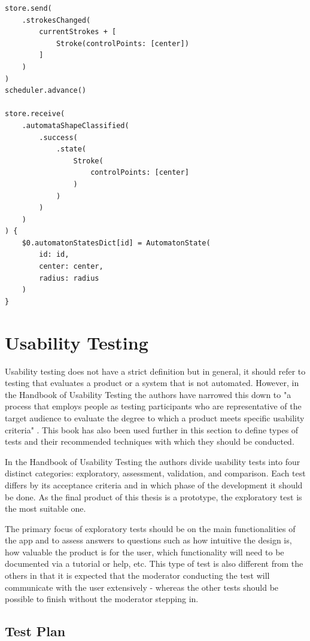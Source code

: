 \begin{lstlisting}[caption={Testing creating of state}, label=test-state]
store.send(
    .strokesChanged(
        currentStrokes + [
            Stroke(controlPoints: [center])
        ]
    )
)
scheduler.advance()

store.receive(
    .automataShapeClassified(
        .success(
            .state(
                Stroke(
                    controlPoints: [center]
                )
            )
        )
    )
) {
    $0.automatonStatesDict[id] = AutomatonState(
        id: id,
        center: center,
        radius: radius
    )
}
\end{lstlisting}

\section{Usability Testing}

Usability testing does not have a strict definition but in general, it should refer to testing that evaluates a product or a system that is not automated. However, in the Handbook of Usability Testing the authors have narrowed this down to "a process that employs people as testing participants who are representative of the target audience to evaluate the degree to which a product meets specific usability criteria" \cite{handbook-usability-testing}. This book has also been used further in this section to define types of tests and their recommended techniques with which they should be conducted.

In the Handbook of Usability Testing the authors divide usability tests into four distinct categories: exploratory, assessment, validation, and comparison. Each test differs by its acceptance criteria and in which phase of the development it should be done. As the final product of this thesis is a prototype, the exploratory test is the most suitable one.

The primary focus of exploratory tests should be on the main functionalities of the app and to assess answers to questions such as how intuitive the design is, how valuable the product is for the user, which functionality will need to be documented via a tutorial or help, etc. This type of test is also different from the others in that it is expected that the moderator conducting the test will communicate with the user extensively - whereas the other tests should be possible to finish without the moderator stepping in.

\subsection{Test Plan}

